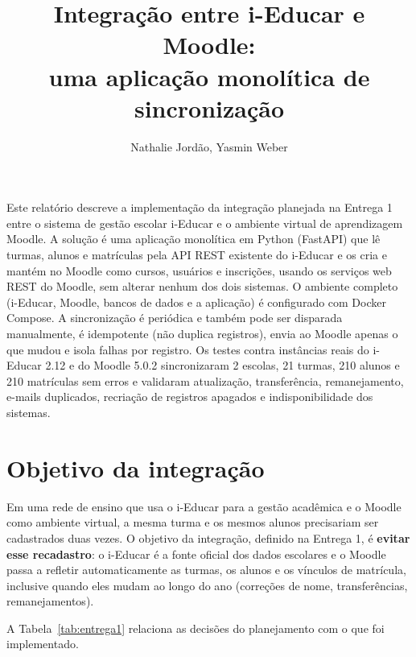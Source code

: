 \documentclass[12pt]{article}
\title{Integração entre i-Educar e Moodle:\\ uma aplicação monolítica de sincronização}
\author{Nathalie Jordão\inst{1}, Yasmin Weber\inst{1}}
\begin{document}
\maketitle

\begin{resumo}
Este relatório descreve a implementação da integração planejada na Entrega 1
entre o sistema de gestão escolar i-Educar e o ambiente virtual de
aprendizagem Moodle. A solução é uma aplicação monolítica em Python (FastAPI)
que lê turmas, alunos e matrículas pela API REST existente do i-Educar e os
cria e mantém no Moodle como cursos, usuários e inscrições, usando os serviços
web REST do Moodle, sem alterar nenhum dos dois sistemas. O ambiente completo
(i-Educar, Moodle, bancos de dados e a aplicação) é configurado com Docker
Compose. A sincronização é periódica e também pode ser disparada manualmente,
é idempotente (não duplica registros), envia ao Moodle apenas o que mudou e
isola falhas por registro. Os testes contra instâncias reais do i-Educar 2.12
e do Moodle 5.0.2 sincronizaram 2 escolas, 21 turmas, 210 alunos e 210
matrículas sem erros e validaram atualização, transferência, remanejamento,
e-mails duplicados, recriação de registros apagados e indisponibilidade dos
sistemas.
\end{resumo}

\section{Objetivo da integração}

Em uma rede de ensino que usa o i-Educar para a gestão acadêmica e o Moodle
como ambiente virtual, a mesma turma e os mesmos alunos precisariam ser
cadastrados duas vezes. O objetivo da integração, definido na Entrega 1, é
\textbf{evitar esse recadastro}: o i-Educar é a fonte oficial dos dados
escolares e o Moodle passa a refletir automaticamente as turmas, os alunos e
os vínculos de matrícula, inclusive quando eles mudam ao longo do ano
(correções de nome, transferências, remanejamentos).

A Tabela~\ref{tab:entrega1} relaciona as decisões do planejamento com o que foi
implementado.
\end{document}
